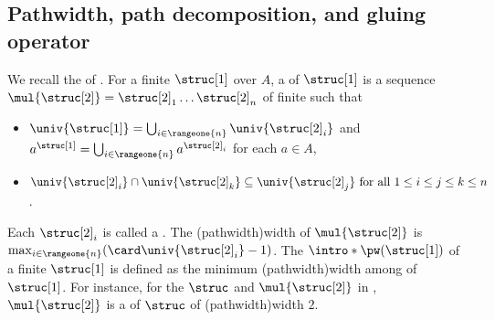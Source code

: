 %
%
%
%
%
%
%
%
%
%
%
%
%
%

\subsection{Pathwidth, path decomposition, and gluing operator}
\AP
We recall the  of  \cite[Def.\ 9.12]{courcelleGraphStructureMonadic2012}.
For a finite  $\struc[1]$ over $A$,
a \intro*{} of $\struc[1]$ is a sequence $\mul{\struc[2]} = \struc[2]_1 \dots \struc[2]_n$ of finite  such that
\begin{itemize}
    \item $\univ{\struc[1]} = \bigcup_{i \in \rangeone{n}} \univ{\struc[2]_{i}}$ and $a^{\struc[1]} = \bigcup_{i \in \rangeone{n}} a^{\struc[2]_{i}}$ for each $a \in A$,
    \item $\univ{\struc[2]_i} \cap \univ{\struc[2]_k} \subseteq \univ{\struc[2]_j} \mbox{ for all $1 \le i \le j \le k \le n$}$.
\end{itemize}
Each $\struc[2]_i$ is called a \intro*{}.
\AP
The \intro*\kl(pathwidth){width} of $\mul{\struc[2]}$ is $\max_{i \in \rangeone{n}}(\card \univ{\struc[2]_i} - 1)$.
The \intro*{} $\intro*\pw(\struc[1])$ of a finite  $\struc[1]$ is defined as the minimum \kl(pathwidth){width} among  of $\struc[1]$.
For instance, for the $\struc$ and $\mul{\struc[2]}$ in ,
$\mul{\struc[2]}$ is a  of $\struc$ of \kl(pathwidth){width} $2$.
